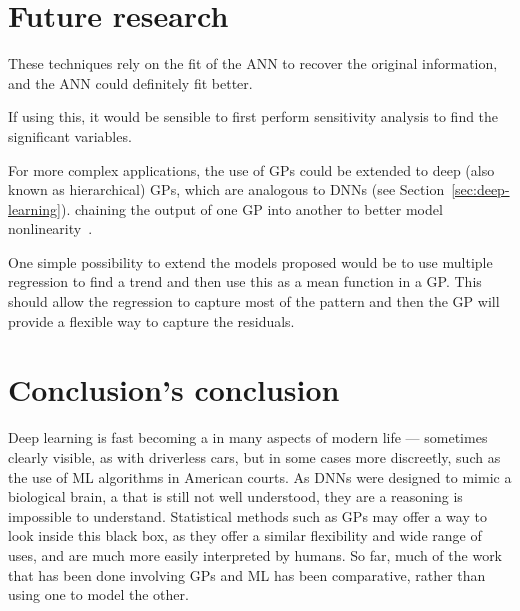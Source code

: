 \section{Future research}

These techniques rely on the fit of the \acl{ANN} to recover the original information, and the \acl{ANN} could definitely fit better.

If using this, it would be sensible to first perform sensitivity analysis to find the significant variables.

For more complex applications, the use of \acp{GP} could be extended to deep (also known as hierarchical) \acp{GP}, which are analogous to \acp{DNN} (see Section~\ref{sec:deep-learning}).
 chaining the output of one \ac{GP} into another to better model nonlinearity~\autocite{damianou2013}.

One simple possibility to extend the models proposed would be to use multiple regression to find a trend and then use this as a mean function in a \ac{GP}.
This should allow the regression to capture most of the pattern and then the \ac{GP} will provide a flexible way to capture the residuals.

\section{Conclusion's conclusion}

Deep learning is fast becoming a  in many aspects of modern life --- sometimes clearly visible, as with driverless cars, but in some cases more discreetly, such as the use of \ac{ML} algorithms in American courts.
As \acp{DNN} were designed to mimic a biological brain, a  that is still not well understood, they are a   reasoning is impossible to understand.
Statistical methods such as \acp{GP} may offer a way to look inside this black box, as they offer a similar flexibility and wide range of uses, and are much more easily interpreted by humans.
So far, much of the work that has been done involving \acp{GP} and \ac{ML} has been comparative, rather than using one to model the other.

